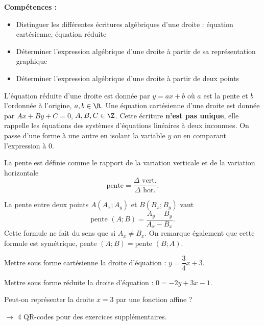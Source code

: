 \documentclass[a4paper,12pt]{report}
\begin{document}
{\bfseries Compétences :}
\begin{itemize}
 \item Distinguer les différentes écritures algébriques d'une droite : équation cartésienne, équation réduite
 \item Déterminer l'expression algébrique d'une droite à partir de sa représentation graphique
 \item Déterminer l'expression algébrique d'une droite à partir de deux points
\end{itemize}
\begin{defi}
	L'équation réduite d'une droite est donnée par $y=ax+b$ où $a$ est la pente et $b$ l'ordonnée à l'origine, $a,b\in \R$. Une équation cartésienne d'une droite est donnée par $Ax+By+C=0$, $A,B,C \in \Z$. Cette écriture {\bfseries n'est pas unique}, elle rappelle les équations des systèmes d'équations linéaires à deux inconnues. On passe d'une forme à une autre en isolant la variable $y$ ou en comparant l'expression à $0$.
\end{defi}
\begin{defi}
La pente est définie comme le rapport de la variation verticale et de la variation horizontale \[\text{pente}=\dfrac{\Delta \text{ vert.}}{\Delta \text{ hor.}}.\]
\end{defi}

\begin{rem}
        La pente entre deux points $A(A_x;A_y)$ et $B(B_x;B_y)$ vaut \[\text{pente }(A;B)=\dfrac{A_y-B_y}{A_x-B_x}.\]
        Cette formule ne fait du sens que si $A_x\neq B_x$. On remarque également que cette formule est symétrique, $\text{pente }(A;B)=\text{pente }(B;A)$.
\end{rem}
\begin{boiteExT}
\vspace{8cm}
\end{boiteExT}
\medskip

\begin{exo}
  Mettre sous forme cartésienne la droite d'équation : $y=\dfrac{3}{4}x+3$. 
\end{exo}
\begin{exo}
 Mettre sous forme réduite la droite d'équation : $0=-2y+3x-1$.
\end{exo}
\begin{exo}
Peut-on représenter la droite $x=3$ par une fonction affine ? 
\end{exo}
$\rightarrow$ 4 QR-codes pour des exercices supplémentaires.
\newpage
\end{document}
